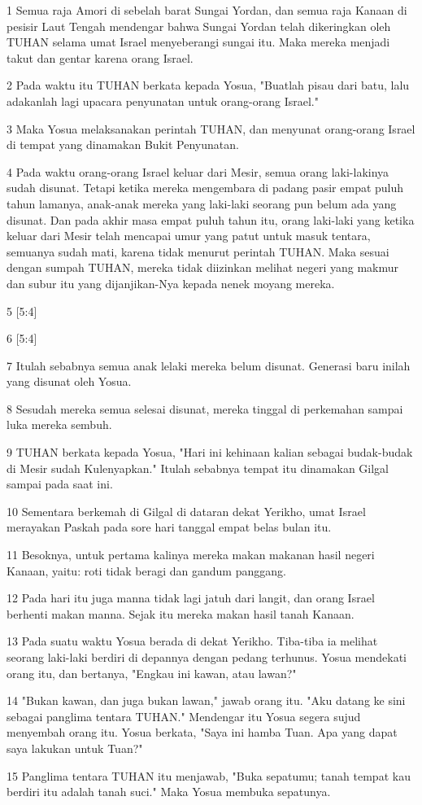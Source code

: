 \par 1 Semua raja Amori di sebelah barat Sungai Yordan, dan semua raja Kanaan di pesisir Laut Tengah mendengar bahwa Sungai Yordan telah dikeringkan oleh TUHAN selama umat Israel menyeberangi sungai itu. Maka mereka menjadi takut dan gentar karena orang Israel.
\par 2 Pada waktu itu TUHAN berkata kepada Yosua, "Buatlah pisau dari batu, lalu adakanlah lagi upacara penyunatan untuk orang-orang Israel."
\par 3 Maka Yosua melaksanakan perintah TUHAN, dan menyunat orang-orang Israel di tempat yang dinamakan Bukit Penyunatan.
\par 4 Pada waktu orang-orang Israel keluar dari Mesir, semua orang laki-lakinya sudah disunat. Tetapi ketika mereka mengembara di padang pasir empat puluh tahun lamanya, anak-anak mereka yang laki-laki seorang pun belum ada yang disunat. Dan pada akhir masa empat puluh tahun itu, orang laki-laki yang ketika keluar dari Mesir telah mencapai umur yang patut untuk masuk tentara, semuanya sudah mati, karena tidak menurut perintah TUHAN. Maka sesuai dengan sumpah TUHAN, mereka tidak diizinkan melihat negeri yang makmur dan subur itu yang dijanjikan-Nya kepada nenek moyang mereka.
\par 5 [5:4]
\par 6 [5:4]
\par 7 Itulah sebabnya semua anak lelaki mereka belum disunat. Generasi baru inilah yang disunat oleh Yosua.
\par 8 Sesudah mereka semua selesai disunat, mereka tinggal di perkemahan sampai luka mereka sembuh.
\par 9 TUHAN berkata kepada Yosua, "Hari ini kehinaan kalian sebagai budak-budak di Mesir sudah Kulenyapkan." Itulah sebabnya tempat itu dinamakan Gilgal sampai pada saat ini.
\par 10 Sementara berkemah di Gilgal di dataran dekat Yerikho, umat Israel merayakan Paskah pada sore hari tanggal empat belas bulan itu.
\par 11 Besoknya, untuk pertama kalinya mereka makan makanan hasil negeri Kanaan, yaitu: roti tidak beragi dan gandum panggang.
\par 12 Pada hari itu juga manna tidak lagi jatuh dari langit, dan orang Israel berhenti makan manna. Sejak itu mereka makan hasil tanah Kanaan.
\par 13 Pada suatu waktu Yosua berada di dekat Yerikho. Tiba-tiba ia melihat seorang laki-laki berdiri di depannya dengan pedang terhunus. Yosua mendekati orang itu, dan bertanya, "Engkau ini kawan, atau lawan?"
\par 14 "Bukan kawan, dan juga bukan lawan," jawab orang itu. "Aku datang ke sini sebagai panglima tentara TUHAN." Mendengar itu Yosua segera sujud menyembah orang itu. Yosua berkata, "Saya ini hamba Tuan. Apa yang dapat saya lakukan untuk Tuan?"
\par 15 Panglima tentara TUHAN itu menjawab, "Buka sepatumu; tanah tempat kau berdiri itu adalah tanah suci." Maka Yosua membuka sepatunya.

